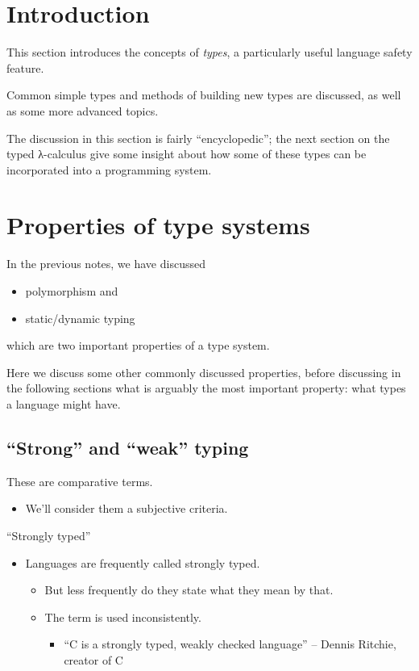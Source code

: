 \documentclass[11pt]{article}
\theoremstyle{definition}
\begin{document}
\section{Introduction}
\label{sec:org50d4033}

This section introduces the concepts of \emph{types},
a particularly useful language safety feature.

Common simple types and methods of building new types are discussed,
as well as some more advanced topics.

The discussion in this section is fairly “encyclopedic”;
the next section on the typed λ-calculus give some insight about
how some of these types can be incorporated into a programming system.

\section{Properties of type systems}
\label{sec:org17a5557}

In the previous notes, we have discussed
\begin{itemize}
\item polymorphism and
\item static/dynamic typing
\end{itemize}
which are two important properties of a type system.

Here we discuss some other commonly discussed properties,
before discussing in the following sections
what is arguably the most important property:
what types a language might have.

\subsection{“Strong” and “weak” typing}
\label{sec:orgf7ae74c}

These are comparative terms.
\begin{itemize}
\item We'll consider them a subjective criteria.
\end{itemize}

“Strongly typed”
\begin{itemize}
\item Languages are frequently called strongly typed.
\begin{itemize}
\item But less frequently do they state what they mean by that.
\item The term is used inconsistently.
\begin{itemize}
\item “C is a strongly typed, weakly checked language”
– Dennis Ritchie, creator of C
\end{itemize}
\end{itemize}
\end{itemize}
\end{document}

